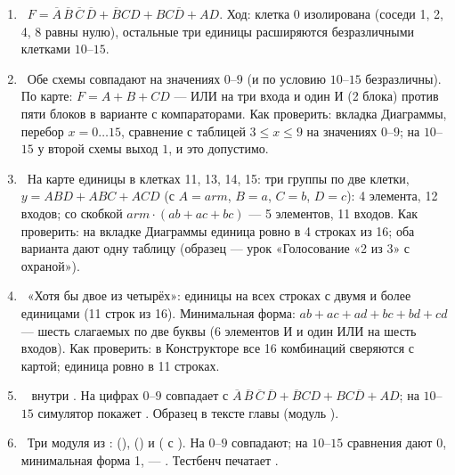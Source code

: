 \begin{enumerate}
  \item {}~$F=\overline{A}\,\overline{B}\,\overline{C}\,\overline{D}+\overline{B}CD+BC\overline{D}+AD$. Ход: клетка 0 изолирована (соседи 1, 2, 4, 8 равны нулю), остальные три единицы расширяются безразличными клетками $10$--$15$.
  \item {}~Обе схемы совпадают на значениях $0$--$9$ (и по условию $10$--$15$ безразличны). По карте: $F=A+B+CD$ --- ИЛИ на три входа и один И (2 блока) против пяти блоков в варианте с компараторами. Как проверить: вкладка Диаграммы, перебор $x=0\ldots15$, сравнение с таблицей $3\le x\le9$ на значениях $0$--$9$; на $10$--$15$ у второй схемы выход $1$, и это допустимо.
  \item {}~На карте единицы в клетках 11, 13, 14, 15: три группы по две клетки, $y=ABD+ABC+ACD$ (с $A=arm$, $B=a$, $C=b$, $D=c$): 4 элемента, 12 входов; со скобкой $arm\cdot(ab+ac+bc)$ --- 5 элементов, 11 входов. Как проверить: на вкладке Диаграммы единица ровно в 4 строках из 16; оба варианта дают одну таблицу (образец --- урок «Голосование «2 из 3» с охраной»).
  \item {}~«Хотя бы двое из четырёх»: единицы на всех строках с двумя и более единицами (11 строк из 16). Минимальная форма: $ab+ac+ad+bc+bd+cd$ --- шесть слагаемых по две буквы (6 элементов И и один ИЛИ на шесть входов). Как проверить: в Конструкторе все 16 комбинаций сверяются с картой; единица ровно в 11 строках.
  \item {}~ внутри . На цифрах $0$--$9$ совпадает с $\overline{A}\,\overline{B}\,\overline{C}\,\overline{D}+\overline{B}CD+BC\overline{D}+AD$; на $10$--$15$ симулятор покажет . Образец в тексте главы (модуль ).
  \item {}~Три модуля из :  (),  () и  ( с ). На $0$--$9$ совпадают; на $10$--$15$ сравнения дают 0, минимальная форма 1,  --- . Тестбенч  печатает .
\end{enumerate}

